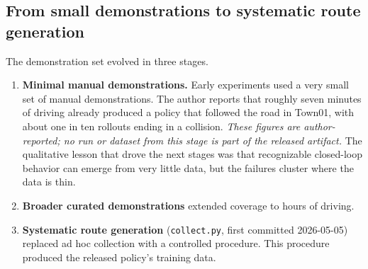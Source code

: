 \documentclass[11pt]{article}
\begin{document}
\subsection{From small demonstrations to systematic route generation}
\label{sec:routegen}

The demonstration set evolved in three stages.
\begin{enumerate}
  \item \textbf{Minimal manual demonstrations.} Early experiments used a very small set of manual demonstrations. The author reports that roughly seven minutes of driving already produced a policy that followed the road in Town01, with about one in ten rollouts ending in a collision. \emph{These figures are author-reported; no run or dataset from this stage is part of the released artifact.} The qualitative lesson that drove the next stages was that recognizable closed-loop behavior can emerge from very little data, but the failures cluster where the data is thin.
  \item \textbf{Broader curated demonstrations} extended coverage to hours of driving.
  \item \textbf{Systematic route generation} (\texttt{collect.py}, first committed 2026-05-05) replaced ad hoc collection with a controlled procedure. This procedure produced the released policy's training data.
\end{enumerate}
\end{document}
